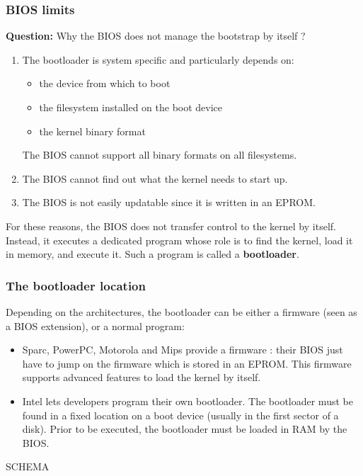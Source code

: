 %
%
%

\begin{frame}
  \frametitle{BIOS limits}

  {\bf Question:} Why the BIOS does not manage the bootstrap by itself ?

  \-

  \begin{enumerate}
  \item The bootloader is system specific and particularly depends on:

  \begin{itemize}
  \item the device from which to boot
  \item the filesystem installed on the boot device
  \item the kernel binary format
  \end{itemize}

  The BIOS cannot support all binary formats on all filesystems.

  \-

  \item The BIOS cannot find out what the kernel needs to start up.

  \-

  \item The BIOS is not easily updatable since it is written in an EPROM.

  \end{enumerate}

  \-

  For these reasons, the BIOS does not transfer control to the kernel by itself. Instead, it executes a dedicated program whose role is to find the kernel, load it in memory, and execute it. Such a program is called a {\bf bootloader}.



\end{frame}

%
%
%

\begin{frame}
  \frametitle{The bootloader location}

  Depending on the architectures, the bootloader can be either a firmware (seen as a BIOS extension), or a normal program:

  \-

  \begin{itemize}
  \item Sparc, PowerPC, Motorola and Mips provide a firmware : their BIOS just have to jump on the firmware which is stored in an EPROM. This firmware supports advanced features to load the kernel by itself.

  \-

  \item Intel lets developers program their own bootloader. The bootloader must be found in a fixed location on a boot device (usually in the first sector of a disk). Prior to be executed, the bootloader must be loaded in RAM by the BIOS.
  \end{itemize}

  \-

  SCHEMA

\end{frame}

